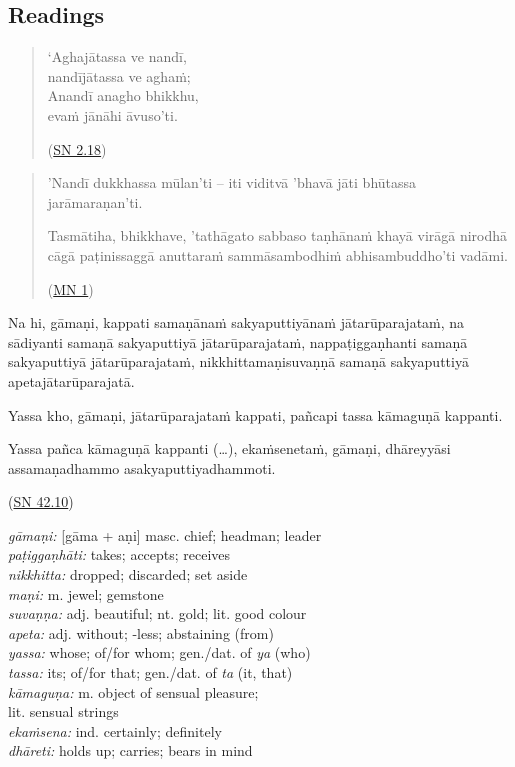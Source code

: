 \documentclass[11pt,oneside]{memoir}
\begin{document}
\normalArrayStrech

\clearpage

\subsection{Readings}
\label{sec:orge208469}

\begin{quote}
`Aghajātassa ve nandī, \\[0pt]
nandījātassa ve aghaṁ; \\[0pt]
Anandī anagho bhikkhu, \\[0pt]
evaṁ jānāhi āvuso'ti.

(\href{https://suttacentral.net/sn2.18/pli/ms}{SN 2.18})
\end{quote}

\begin{quote}
\raggedright

'Nandī dukkhassa mūlan'ti -- iti viditvā 'bhavā jāti bhūtassa jarāmaraṇan'ti.

Tasmātiha, bhikkhave, 'tathāgato sabbaso taṇhānaṁ khayā virāgā nirodhā cāgā paṭinissaggā anuttaraṁ sammāsambodhiṁ abhisambuddho'ti vadāmi.

(\href{https://suttacentral.net/mn1/pli/ms}{MN 1})
\end{quote}

\bigskip

\begin{widecols}
Na hi, gāmaṇi, kappati samaṇānaṁ sakyaputtiyānaṁ jātarūparajataṁ, na sādiyanti samaṇā sakyaputtiyā jātarūparajataṁ, nappaṭiggaṇhanti samaṇā sakyaputtiyā jātarūparajataṁ, nikkhittamaṇisuvaṇṇā samaṇā sakyaputtiyā apetajātarūparajatā.

Yassa kho, gāmaṇi, jātarūparajataṁ kappati, pañcapi tassa kāmaguṇā kappanti.

Yassa pañca kāmaguṇā kappanti (…), ekaṁsenetaṁ, gāmaṇi, dhāreyyāsi assamaṇadhammo asakyaputtiyadhammoti.

(\href{https://suttacentral.net/sn42.10/pli/ms}{SN 42.10})

\columnbreak

\emph{gāmaṇi:} [gāma + aṇi] masc. chief; headman; leader \\[0pt]
\emph{paṭiggaṇhāti:} takes; accepts; receives \\[0pt]
\emph{nikkhitta:} dropped; discarded; set aside \\[0pt]
\emph{maṇi:} m. jewel; gemstone \\[0pt]
\emph{suvaṇṇa:} adj. beautiful; nt. gold; lit. good colour \\[0pt]
\emph{apeta:} adj. without; -less; abstaining (from) \\[0pt]
\emph{yassa:} whose; of/for whom; gen./dat. of \emph{ya} (who) \\[0pt]
\emph{tassa:} its; of/for that; gen./dat. of \emph{ta} (it, that) \\[0pt]
\emph{kāmaguṇa:} m. object of sensual pleasure; \\[0pt]
lit. sensual strings \\[0pt]
\emph{ekaṁsena:} ind. certainly; definitely \\[0pt]
\emph{dhāreti:} holds up; carries; bears in mind
\end{widecols}
\end{document}
